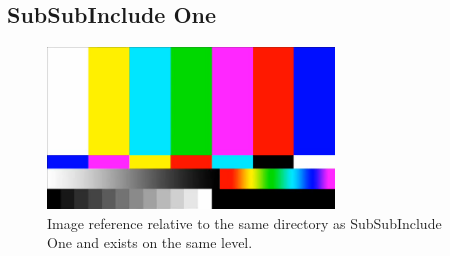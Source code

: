 \subsection{SubSubInclude One}

\lipsum[8]

\begin{figure}%
    \centering
    \caption{Image reference relative to the same directory as SubSubInclude One and exists on the same level.}
    \includegraphics[width = 3in]{Test_card.png}%
\end{figure}